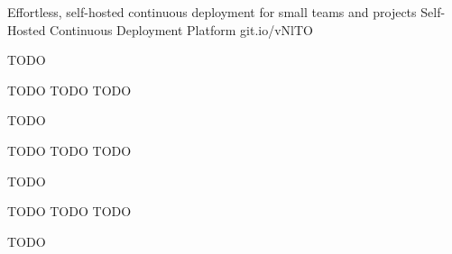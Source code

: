 
\begin{cventries}

  \cventry
    {Effortless, self-hosted continuous deployment for small teams and projects} %
    {Self-Hosted Continuous Deployment Platform} %
    {git.io/vNlTO} %
    {} %
    {
      \begin{cvitems} %
        \item {TODO}
      \end{cvitems}
    }

  \cventry
    {TODO} %
    {TODO} %
    {TODO} %
    {} %
    {
      \begin{cvitems} %
        \item {TODO}
      \end{cvitems}
    }

  \cventry
    {TODO} %
    {TODO} %
    {TODO} %
    {} %
    {
      \begin{cvitems} %
        \item {TODO}
      \end{cvitems}
    }

  \cventry
    {TODO} %
    {TODO} %
    {TODO} %
    {} %
    {
      \begin{cvitems} %
        \item {TODO}
      \end{cvitems}
    }

\end{cventries}
